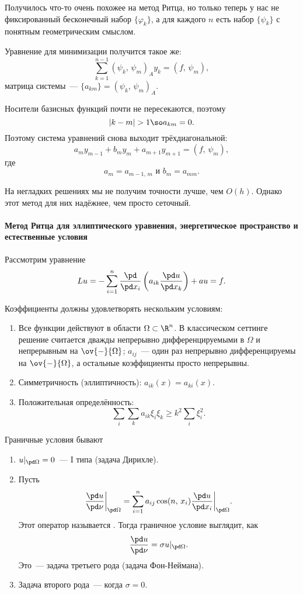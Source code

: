 \documentclass{trlnotes}
\begin{document}
    Получилось что-то очень похожее на метод Ритца, но только теперь у нас не фиксированный бесконечный набор $\{\varphi_k\}$, а для каждого $n$ есть набор $\{\psi_k\}$ с понятным геометрическим смыслом.

    Уравнение для минимизации получится такое же:
    \[
        \sum\limits_{k = 1}^{n - 1}(\psi_k, \, \psi_m)_A y_k = (f, \, \psi_m),
    \]
    матрица системы~--- $\{a_{km}\} = (\psi_k, \, \psi_m)_A$.

    Носители базисных функций почти не пересекаются, поэтому
    \[
        |k - m| > 1 \so a_{km} = 0.
    \]
    Поэтому система уравнений снова выходит трёхдиагональной:
    \[
        a_m y_{m - 1} + b_m y_m + a_{m + 1} y_{m + 1} = (f, \, \psi_m),
    \]
    где
    \[
        a_m = a_{m-1, \, m} \text{ и } b_m = a_{mm}.
    \]

    На негладких решениях мы не получим точности лучше, чем $O(h)$. Однако этот метод для них надёжнее, чем просто сеточный.

    \paragraph{Метод Ритца для эллиптического уравнения, энергетическое пространство и естественные условия}

    Рассмотрим уравнение
    \[
        Lu = - \sum\limits_{i = 1}^n \dfrac{\pd}{\pd x_i}\left(a_{ik} \dfrac{\pd u}{\pd x_k}\right) + au = f.
    \]

    Коэффициенты должны удовлетворять нескольким условиям:

    \begin{enumerate}
        \item Все функции действуют в области $\Omega \subset \R^n$. В классическом сеттинге решение считается дважды непрерывно дифференцируемыми в $\Omega$ и непрерывным на $\ov{-}{\Omega}$; $a_{ij}$~--- один раз непрерывно дифференцируемы на $\ov{-}{\Omega}$, а остальные коэффициенты просто непрерывны.
        \item Симметричность (эллиптичность): $a_{ik}(x) = a_{ki}(x)$.
        \item Положительная определённость:
        \[
            \sum\limits_i \sum\limits_k a_{ik} \xi_i \xi_k \geqslant k^2 \sum\limits_i \xi_i^2.
        \]
    \end{enumerate}

    Граничные условия бывают
    \begin{enumerate}
        \item $u|_{\pd\Omega} = 0$~--- I типа (задача Дирихле).
        \item Пусть
        \[
            \dfrac{\pd u}{\pd \nu} \bigg|_{\pd \Omega} = \sum\limits_{i = 1}^n a_{ij} \cos(n, \, x_i) \dfrac{\pd u}{\pd x_i} \bigg|_{\pd \Omega}.
        \]
        Этот оператор называется .
        Тогда граничное условие выглядит, как
        \[
            \dfrac{\pd u}{\pd \nu} = \sigma u|_{\pd \Omega}.
        \]
        Это~--- задача третьего рода (задача Фон-Неймана).
        \item Задача второго рода~--- когда $\sigma = 0$.
    \end{enumerate}
\end{document}
